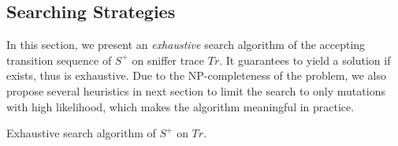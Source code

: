 \subsection{Searching Strategies}
\label{subsec:search}

In this section, we present an \textit{exhaustive} search algorithm of the accepting
transition sequence of $S^+$ on sniffer trace $Tr$.
%
It guarantees to yield a
solution if exists, thus is exhaustive.
%
Due to the NP-completeness of the problem, we also propose several heuristics in
next section to limit the search to only mutations with high likelihood, which
makes the algorithm meaningful in practice.

\begin{algorithm}[t!]
  \caption{Exhaustive search algorithm of $S^+$ on $Tr$.}
  \label{alg:search}
  \begin{algorithmic}[1]
      \State{}
    \EndFunction
    \item[]

        \label{alg:search:stop}
        \State{\Return{\nil}}
      \EndIf

      \label{alg:search:order}
        \EndIf
      \EndFor
      \State\Return{\nil}
    \EndFunction
    \item[]

          \label{alg:search:terminate_0}
        \EndIf
        \label{alg:search:append}
        \EndIf
      \EndFor
      \State{\Return{\nil}}
    \EndFunction
    \item[]

          \label{alg:search:type_1_limit}
        \EndIf
        \label{alg:search:guess}
        \EndIf
      \EndFor
      \State{\Return{\nil}}
    \EndFunction
    \item[]


\end{algorithmic}
\end{algorithm}
